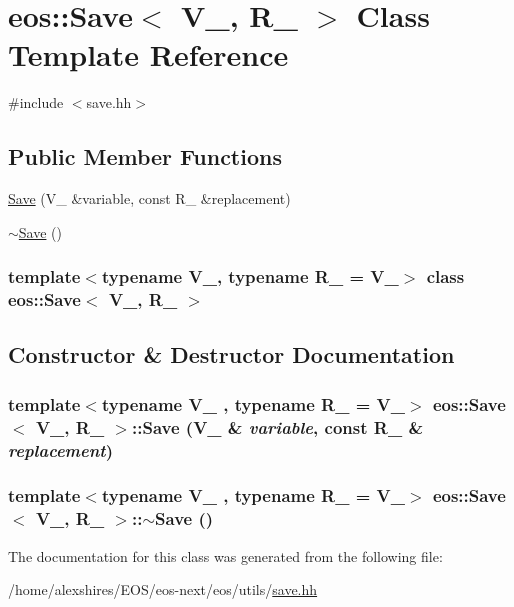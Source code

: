 \hypertarget{classeos_1_1Save}{
\section{eos::Save$<$ V\_\-, R\_\- $>$ Class Template Reference}
\label{classeos_1_1Save}
}


{\ttfamily \#include $<$save.hh$>$}\subsection*{Public Member Functions}
\begin{DoxyCompactItemize}
\item 
\hyperlink{classeos_1_1Save_a199880a2f33c6a819c3a4cd957303ba1}{Save} (V\_\- \&variable, const R\_\- \&replacement)
\item 
\hyperlink{classeos_1_1Save_a4970637cf62612b263c206601002a864}{$\sim$Save} ()
\end{DoxyCompactItemize}
\subsubsection*{template$<$typename V\_\-, typename R\_\- = V\_\-$>$ class eos::Save$<$ V\_\-, R\_\- $>$}



\subsection{Constructor \& Destructor Documentation}
\hypertarget{classeos_1_1Save_a199880a2f33c6a819c3a4cd957303ba1}{
\subsubsection[{Save}]{\setlength{\rightskip}{0pt plus 5cm}template$<$typename V\_\- , typename R\_\-  = V\_\-$>$ {\bf eos::Save}$<$ V\_\-, R\_\- $>$::{\bf Save} (V\_\- \& {\em variable}, \/  const R\_\- \& {\em replacement})}}
\label{classeos_1_1Save_a199880a2f33c6a819c3a4cd957303ba1}
\hypertarget{classeos_1_1Save_a4970637cf62612b263c206601002a864}{
\subsubsection[{$\sim$Save}]{\setlength{\rightskip}{0pt plus 5cm}template$<$typename V\_\- , typename R\_\-  = V\_\-$>$ {\bf eos::Save}$<$ V\_\-, R\_\- $>$::$\sim${\bf Save} ()}}
\label{classeos_1_1Save_a4970637cf62612b263c206601002a864}


The documentation for this class was generated from the following file:\begin{DoxyCompactItemize}
\item 
/home/alexshires/EOS/eos-\/next/eos/utils/\hyperlink{save_8hh}{save.hh}\end{DoxyCompactItemize}
